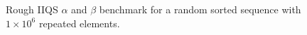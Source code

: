 \begin{figure}


    
    \caption{Rough IIQS $\alpha$ and $\beta$ benchmark for a random sorted sequence with $1\times10^6$ repeated elements.}
    \label{FIG:05_ALPHABETA_BENCHMARK_RANDOM}
\end{figure}




